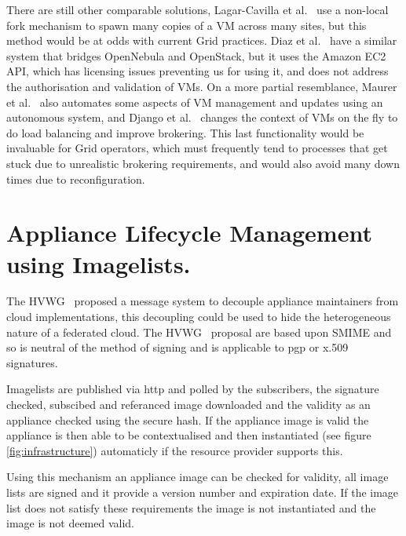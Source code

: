 \documentclass[oribibl]{llncs}
\begin{document}
There are still other comparable solutions, Lagar-Cavilla et al.~\cite{Lagar-Cavilla2009} use a non-local fork mechanism to spawn many copies of a VM across many sites, but this method would be at odds with current Grid practices. Diaz et al.~\cite{Diaz2012} have a similar system that bridges OpenNebula and OpenStack, but it uses the Amazon EC2 API, which has licensing issues preventing us for using it, and does not address the authorisation and validation of VMs. On a more partial resemblance, Maurer et al.~\cite{Maurer2013} also automates some aspects of VM management and updates using an autonomous system, and Django et al.~\cite{Django2013} changes the context of VMs on the fly to do load balancing and improve brokering. This last functionality would be invaluable for Grid operators, which must frequently tend to processes that get stuck due to unrealistic brokering requirements, and would also avoid many down times due to reconfiguration.

\section{Appliance Lifecycle Management using Imagelists.}
\label{sect-appliancelifecycle}
The HVWG~\cite{hepix} proposed a message system to decouple appliance maintainers from cloud implementations, this decoupling could be used to hide the heterogeneous nature of a federated cloud. The HVWG~\cite{hepix} proposal are based upon SMIME and so is neutral of the method of signing and is applicable to pgp or x.509 signatures.

Imagelists are published via http and polled by the subscribers, the signature checked, subscibed and referanced image downloaded and the validity as an appliance checked using the secure hash. If the appliance image is valid the appliance is then able to be contextualised and then instantiated (see figure \ref{fig:infrastructure}) automaticly if the resource provider supports this.

Using this mechanism an appliance image can be checked for validity, all image lists are signed and it provide a version number and expiration date. If the image list does not satisfy these requirements the image is not instantiated and the image is not deemed valid.
\end{document}
